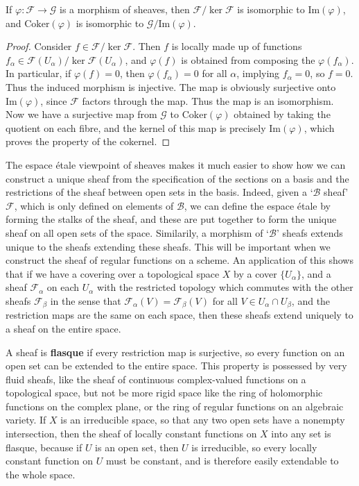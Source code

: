 \begin{theorem}
    If $\varphi: \mathcal{F} \to \mathcal{G}$ is a morphism of sheaves, then $\mathcal{F} / \ker \mathcal{F}$ is isomorphic to $\text{Im}(\varphi)$, and $\text{Coker}(\varphi)$ is isomorphic to $\mathcal{G} / \text{Im}(\varphi)$.
\end{theorem}
\begin{proof}
    Consider $f \in \mathcal{F} / \ker \mathcal{F}$. Then $f$ is locally made up of functions $f_\alpha \in \mathcal{F}(U_\alpha) / \ker \mathcal{F}(U_\alpha)$, and $\varphi(f)$ is obtained from composing the $\varphi(f_\alpha)$. In particular, if $\varphi(f) = 0$, then $\varphi(f_\alpha) = 0$ for all $\alpha$, implying $f_\alpha = 0$, so $f = 0$. Thus the induced morphism is injective. The map is obviously surjective onto $\text{Im}(\varphi)$, since $\mathcal{F}$ factors through the map. Thus the map is an isomorphism. Now we have a surjective map from $\mathcal{G}$ to $\text{Coker}(\varphi)$ obtained by taking the quotient on each fibre, and the kernel of this map is precisely $\text{Im}(\varphi)$, which proves the property of the cokernel.
\end{proof}

The espace \'{e}tale viewpoint of sheaves makes it much easier to show how we can construct a unique sheaf from the specification of the sections on a basis and the restrictions of the sheaf between open sets in the basis. Indeed, given a `$\mathcal{B}$ sheaf' $\mathcal{F}$, which is only defined on elements of $\mathcal{B}$, we can define the espace \'{e}tale by forming the stalks of the sheaf, and these are put together to form the unique sheaf on all open sets of the space. Similarily, a morphism of `$\mathcal{B}$' sheafs extends unique to the sheafs extending these sheafs. This will be important when we construct the sheaf of regular functions on a scheme. An application of this shows that if we have a covering over a topological space $X$ by a cover $\{ U_\alpha \}$, and a sheaf $\mathcal{F}_\alpha$ on each $U_\alpha$ with the restricted topology which commutes with the other sheafs $\mathcal{F}_\beta$ in the sense that $\mathcal{F}_\alpha(V) = \mathcal{F}_\beta(V)$ for all $V \in U_\alpha \cap U_\beta$, and the restriction maps are the same on each space, then these sheafs extend uniquely to a sheaf on the entire space.

A sheaf is {\bf flasque} if every restriction map is surjective, so every function on an open set can be extended to the entire space. This property is possessed by very fluid sheafs, like the sheaf of continuous complex-valued functions on a topological space, but not be more rigid space like the ring of holomorphic functions on the complex plane, or the ring of regular functions on an algebraic variety. If $X$ is an irreducible space, so that any two open sets have a nonempty intersection, then the sheaf of locally constant functions on $X$ into any set is flasque, because if $U$ is an open set, then $U$ is irreducible, so every locally constant function on $U$ must be constant, and is therefore easily extendable to the whole space.

